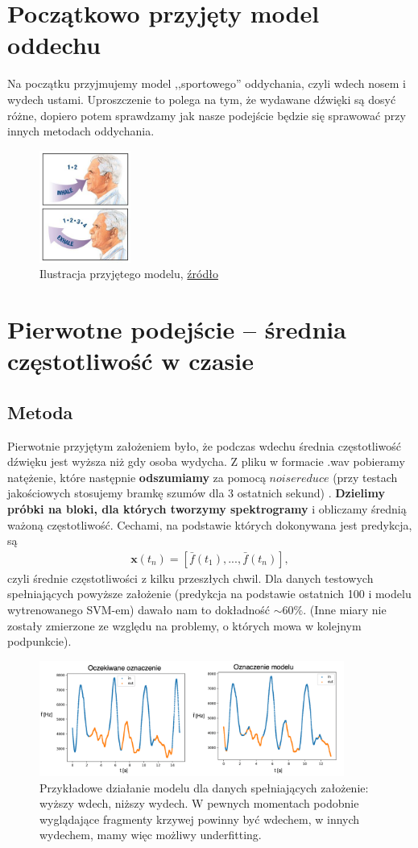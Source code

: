 \documentclass[polish]{article}
\begin{document}
\section{Początkowo przyjęty model oddechu}
Na początku przyjmujemy model ,,sportowego'' oddychania, czyli wdech nosem i wydech ustami. Uproszczenie to polega na tym, że wydawane dźwięki są dosyć różne, dopiero potem sprawdzamy jak nasze podejście będzie się sprawować
przy innych metodach oddychania.
\begin{figure}[H]
	\centering
	\includegraphics[width=3cm]{model_oddechu}
  	\caption{Ilustracja przyjętego modelu,  \href{https://www.quora.com/Should-I-exhale-from-the-mouth-or-nose-while-deep-breathing}{źródło}}
\end{figure}
\section{Pierwotne podejście -- średnia częstotliwość w czasie}
\subsection{Metoda}
Pierwotnie przyjętym założeniem było, że podczas wdechu średnia częstotliwość dźwięku jest wyższa niż gdy osoba wydycha. Z pliku w formacie .wav pobieramy natężenie, które następnie \textbf{odszumiamy} za pomocą $noisereduce$ (przy testach jakościowych stosujemy bramkę szumów dla 3 ostatnich sekund) . 
\textbf{Dzielimy próbki na bloki, dla których tworzymy spektrogramy} i obliczamy
średnią ważoną częstotliwość. Cechami, na podstawie których dokonywana jest predykcja, są  
\begin{gather*}
\boldsymbol x (t_n) = [\bar{f}(t_1), ..., \bar{f}(t_n)],
\end{gather*}
czyli średnie częstotliwości z kilku przeszłych chwil.
Dla danych testowych spełniających powyższe założenie (predykcja na podstawie ostatnich 100 i modelu wytrenowanego SVM-em) dawało nam to dokładność $\sim 60\%$.
(Inne miary nie zostały zmierzone ze względu na problemy, o których mowa w kolejnym podpunkcie).
\begin{figure}[H]
	\centering
	\includegraphics[width=10cm]{porownanie_srednie}
	\caption{Przykładowe działanie modelu dla danych spełniających założenie: wyższy wdech, niższy wydech.
	W pewnych momentach podobnie wyglądające fragmenty krzywej powinny być wdechem, w innych wydechem, mamy więc możliwy underfitting.}
\end{figure}
\end{document}
